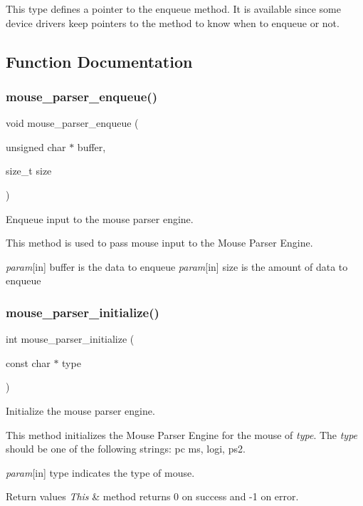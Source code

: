 This type defines a pointer to the enqueue method. It is available since some device drivers keep pointers to the method to know when to enqueue or not. 

\subsection{Function Documentation}
\mbox{\label{group__libmisc__mouseparser_ga95a92fecbb5e07b8c34596d3f67bfefa}} 
\subsubsection{\texorpdfstring{mouse\_parser\_enqueue()}{mouse\_parser\_enqueue()}}
{\footnotesize\ttfamily void mouse\+\_\+parser\+\_\+enqueue (\begin{DoxyParamCaption}\item[{unsigned char $\ast$}]{buffer,  }\item[{size\+\_\+t}]{size }\end{DoxyParamCaption})}



Enqueue input to the mouse parser engine. 

This method is used to pass mouse input to the Mouse Parser Engine.

{\itshape param}\mbox{[}in\mbox{]} buffer is the data to enqueue {\itshape param}\mbox{[}in\mbox{]} size is the amount of data to enqueue \mbox{\label{group__libmisc__mouseparser_ga8fecea0e5c8c28c77ce0b80a70827302}} 
\subsubsection{\texorpdfstring{mouse\_parser\_initialize()}{mouse\_parser\_initialize()}}
{\footnotesize\ttfamily int mouse\+\_\+parser\+\_\+initialize (\begin{DoxyParamCaption}\item[{const char $\ast$}]{type }\end{DoxyParamCaption})}



Initialize the mouse parser engine. 

This method initializes the Mouse Parser Engine for the mouse of {\itshape type}. The {\itshape type} should be one of the following strings\+: pc ms, logi, ps2.

{\itshape param}\mbox{[}in\mbox{]} type indicates the type of mouse.


\begin{DoxyRetVals}{Return values}
{\em This} & method returns 0 on success and -\/1 on error. \\
\hline
\end{DoxyRetVals}
